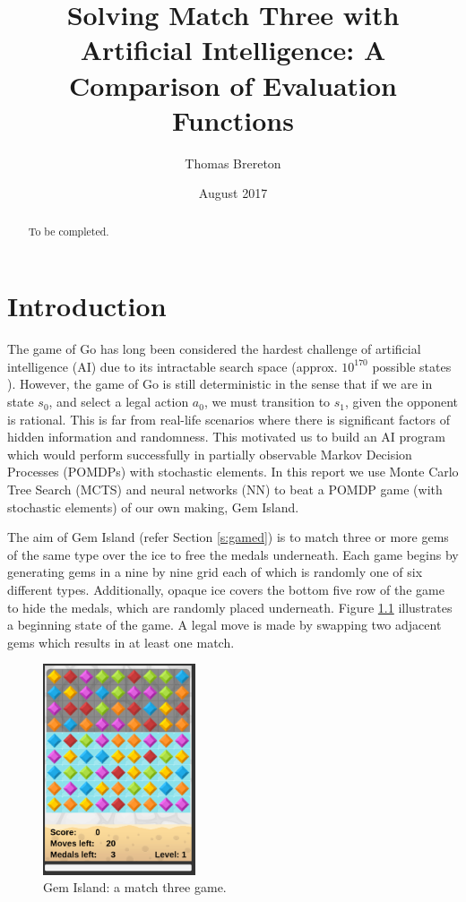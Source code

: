 \documentclass{bhamthesis}
\title{Solving Match Three with Artificial Intelligence: A Comparison of Evaluation Functions}
\author{Thomas Brereton}
\date{August 2017}  %
\makeatletter
\theoremstyle{definition}
\newcommand{\makecrestcover}{%
\begin{titlepage}
\centering\singlespacing
\vspace*{1cm}
{\huge\bfseries University of Birmingham\par}
\vspace*{2cm}
\texttt{[image: crest]}\par
\vspace*{\stretch{1}}
{\Huge\bfseries
\@author\par
\vspace{1cm}
\@title\par}
\vspace*{\stretch{1}}
{\Large\@date\par}
\end{titlepage}
}
\makeatother
\begin{document}
\frontmatter

\maketitle


\begin{abstract}
To be completed.
\end{abstract}

\tableofcontents
\mainmatter

\chapter{Introduction}
The game of Go has long been considered the hardest challenge of artificial intelligence (AI) due to its intractable search space (approx. $10^{170}$ possible states \cite{Gelly2012}). However, the game of Go is still deterministic in the sense that if we are in state $s_0$, and select a legal action $a_0$, we must transition to $s_1$, given the opponent is rational. This is far from real-life scenarios where there is significant factors of hidden information and randomness. This motivated us to build an AI program which would perform successfully in partially observable Markov Decision Processes (POMDPs) with stochastic elements. In this report we use Monte Carlo Tree Search (MCTS) and neural networks (NN) to beat a POMDP game (with stochastic elements) of our own making, Gem Island. 

The aim of Gem Island (refer Section \ref{s:gamed}) is to match three or more gems of the same type over the ice to free the medals underneath. Each game begins by generating gems in a nine by nine grid each of which is randomly one of six different types. Additionally, opaque ice covers the bottom five row of the game to hide the medals, which are randomly placed underneath. Figure \ref{f:gemIsland} illustrates a beginning state of the game. A legal move is made by swapping two adjacent gems which results in at least one match.

\begin{figure}[h]
	\centering
	\includegraphics[width=0.4\textwidth]{media/img/screen2}
	\caption{Gem Island: a match three game.}\label{f:gemIsland}
\end{figure}
\end{document}
